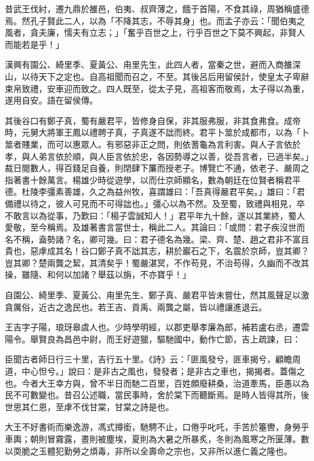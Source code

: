 
\begin{pinyinscope}
昔武王伐紂，遷九鼎於雒邑，伯夷、叔齊薄之，餓于首陽，不食其祿，周猶稱盛德焉。然孔子賢此二人，以為「不降其志，不辱其身」也。而孟子亦云：「聞伯夷之風者，貪夫廉，懦夫有立志；」「奮乎百世之上，行乎百世之下莫不興起，非賢人而能若是乎！」

漢興有園公、綺里季、夏黃公、甪里先生，此四人者，當秦之世，避而入商雒深山，以待天下之定也。自高祖聞而召之，不至。其後呂后用留侯計，使皇太子卑辭束帛致禮，安車迎而致之。四人既至，從太子見，高祖客而敬焉，太子得以為重，遂用自安。語在留侯傳。

其後谷口有鄭子真，蜀有嚴君平，皆修身自保，非其服弗服，非其食弗食。成帝時，元舅大將軍王鳳以禮聘子真，子真遂不詘而終。君平卜筮於成都巿，以為「卜筮者賤業，而可以惠眾人。有邪惡非正之問，則依蓍龜為言利害。與人子言依於孝，與人弟言依於順，與人臣言依於忠，各因勢導之以善，從吾言者，已過半矣。」裁日閱數人，得百錢足自養，則閉肆下簾而授老子。博覽亡不通，依老子、嚴周之指著書十餘萬言。楊雄少時從遊學，以而仕京師顯名，數為朝廷在位賢者稱君平德。杜陵李彊素善雄，久之為益州牧，喜謂雄曰：「吾真得嚴君平矣。」雄曰：「君備禮以待之，彼人可見而不可得詘也。」彊心以為不然。及至蜀，致禮與相見，卒不敢言以為從事，乃歎曰：「楊子雲誠知人！」君平年九十餘，遂以其業終，蜀人愛敬，至今稱焉。及雄著書言當世士，稱此二人。其論曰：「或問：君子疾沒世而名不稱，盍勢諸？名，卿可幾。曰：君子德名為幾。梁、齊、楚、趙之君非不富且貴也，惡虖成其名！谷口鄭子真不詘其志，耕於巖石之下，名震於京師，豈其卿？豈其卿？楚兩龔之絜，其清矣乎！蜀嚴湛冥，不作苟見，不治苟得，久幽而不改其操，雖隨、和何以加諸？舉茲以旃，不亦寶乎！」

自園公、綺里季、夏黃公、甪里先生、鄭子真、嚴君平皆未嘗仕，然其風聲足以激貪厲俗，近古之逸民也。若王吉、貢禹、兩龔之屬，皆以禮讓進退云。

王吉字子陽，琅玡皋虞人也。少時學明經，以郡吏舉孝廉為郎，補若盧右丞，遷雲陽令。舉賢良為昌邑中尉，而王好遊獵，驅馳國中，動作亡節，吉上疏諫，曰：

臣聞古者師日行三十里，吉行五十里。《詩》云：「匪風發兮，匪車揭兮，顧瞻周道，中心怛兮。」說曰：是非古之風也，發發者；是非古之車也，揭揭者。蓋傷之也。今者大王幸方與，曾不半日而馳二百里，百姓頗廢耕桑，治道牽馬，臣愚以為民不可數變也。昔召公述職，當民事時，舍於棠下而聽斷焉。是時人皆得其所，後世思其仁恩，至虖不伐甘棠，甘棠之詩是也。

大王不好書術而樂逸游，馮式撙銜，馳騁不止，口倦乎叱吒，手苦於箠轡，身勞乎車輿；朝則冒霧露，晝則被塵埃，夏則為大暑之所暴炙，冬則為風寒之所匽薄。數以耎脆之玉體犯勤勞之煩毒，非所以全壽命之宗也，又非所以進仁義之隆也。


\end{pinyinscope}

